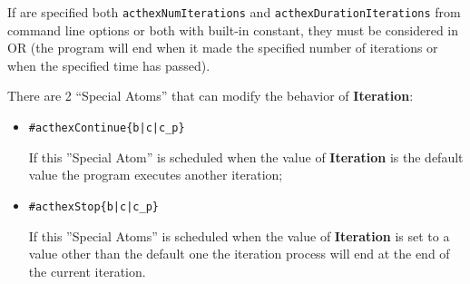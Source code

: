 \documentclass[a4paper, 11pt]{article}
\newcommand{\Iteration}{\textbf{Iteration}\xspace}
\begin{document}
		If are specified both \verb|acthexNumIterations| and \verb|acthexDurationIterations| from command line options or both with built-in constant, they must be considered in OR (the program will end when it made ​​the specified number of iterations or when the specified time has passed).

		\vspace*{1em}

		There are 2 ``Special Atoms'' that can modify the behavior of \Iteration:
		\begin{itemize}
			\item \verb+#acthexContinue{b|c|c_p}+

				If this ''Special Atom'' is scheduled when the value of \Iteration is the default value the program executes another iteration;

			\item \verb+#acthexStop{b|c|c_p}+

				If this ''Special Atoms'' is scheduled when the value of \Iteration is set to a value other than the default one the iteration process will end at the end of the current iteration.
		\end{itemize}
\end{document}
